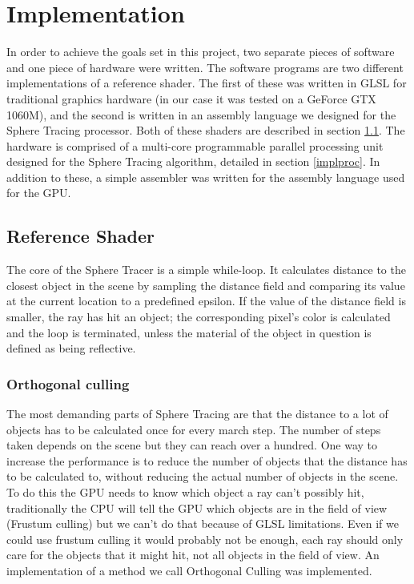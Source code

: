 \chapter{Implementation}

	In order to achieve the goals set in this project, two separate pieces of 
	software and one piece of hardware were written. The software programs are 
	two different implementations of a reference shader. The first of these was 
	written in GLSL for traditional graphics hardware (in our case it was 
	tested on a GeForce GTX 1060M), and the second is written in an assembly 
	language we designed for the Sphere Tracing processor. Both of these 
	shaders are described in section \ref{implshader}. The hardware is 
	comprised of a multi-core programmable parallel processing unit designed 
	for the Sphere Tracing algorithm, detailed in section \ref{implproc}. In 
	addition to these, a simple assembler was written for the assembly language
	used for the GPU.

	\section{Reference Shader} \label{implshader}

		The core of the Sphere Tracer is a simple while-loop. It calculates
		distance to the closest object in the scene by sampling the distance
		field and comparing its value at the current location to a predefined
		epsilon. If the value of the distance field is smaller, the ray has hit
		an object; the corresponding pixel's color is calculated and the loop
		is terminated, unless the material of the object in question is defined
		as being reflective.

		\subsection{Orthogonal culling}

			The most demanding parts of Sphere Tracing are that the distance to
			a lot of objects has to be calculated once for every march step.
			The number of steps taken depends on the scene but they can reach
			over a hundred. One way to increase the performance is to reduce
			the number of objects that the distance has to be calculated to,
			without reducing the actual number of objects in the scene. To do
			this the GPU needs to know which object a ray can't possibly hit,
			traditionally the CPU will tell the GPU which objects are in the
			field of view (Frustum culling) but we can't do that because of
			GLSL limitations. Even if we could use frustum culling it would
			probably not be enough, each ray should only care for the objects
			that it might hit, not all objects in the field of view.  An
			implementation of a method we call Orthogonal Culling was
			implemented.

